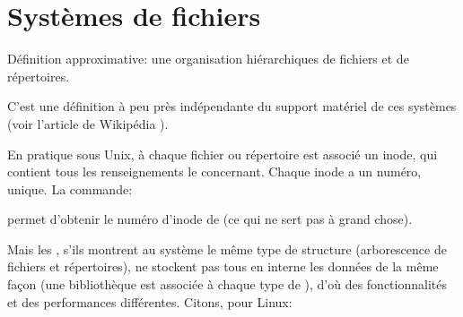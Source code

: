 \section{Systèmes de fichiers}
Définition approximative: une organisation hiérarchiques de fichiers
et de répertoires.

C'est une définition à peu près indépendante du support matériel de
ces systèmes (voir l'article de Wikipédia \cite{fs}).

En pratique sous Unix, à chaque fichier ou répertoire est associé un
\textsf{inode}, qui contient tous les renseignements le
concernant. Chaque inode a un numéro, unique. La commande:


permet d'obtenir le numéro d'inode de  (ce qui ne sert pas
  à grand chose).

  Mais les  \sffs, s'ils montrent au système le même type de
  structure (arborescence de fichiers et répertoires), ne stockent pas 
  tous en interne les données de la même façon (une bibliothèque est
  associée à chaque type de  \sff), d'où des fonctionnalités et des
  performances différentes.
  Citons, pour Linux:


